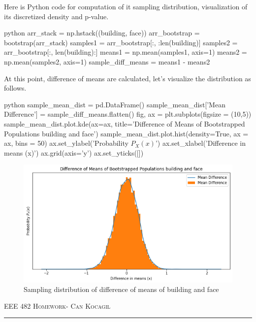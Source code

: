 \documentclass[12pt]{amsart}
\begin{document}
\bigskip
Here is Python code for computation of it sampling distribution, visualization of its discretized density and p-value.

\begin{mintedbox}{python}
arr_stack = np.hstack((building, face))
arr_bootstrap = bootstrap(arr_stack)
samples1 = arr_bootstrap[:, :len(building)]
samples2 = arr_bootstrap[:, len(building):]
means1 = np.mean(samples1, axis=1)
means2 = np.mean(samples2, axis=1)
sample_diff_means = means1 - means2
\end{mintedbox}

At this point, difference of means are calculated, let's visualize the distribution as follows.

\begin{mintedbox}{python}
sample_mean_dist = pd.DataFrame()
sample_mean_dist['Mean Difference'] = sample_diff_means.flatten()
fig, ax = plt.subplots(figsize = (10,5))
sample_mean_dist.plot.kde(ax=ax, title='Difference of Means of Bootstrapped Populations building and face')
sample_mean_dist.plot.hist(density=True, ax = ax, bins = 50)
ax.set_ylabel('Probability $P_X(x)$')
ax.set_xlabel('Difference in means (x)')
ax.grid(axis='y')
ax.set_yticks([])
\end{mintedbox}


\begin{figure}[h]
    \centering
    \includegraphics[width = 1\textwidth]{images/11.png}
    \caption{Sampling distribution of difference of means of building and face}
\end{figure}

\newpage
{\scshape EEE 482} \hfill {\scshape \large  Homework-\relax} \hfill {\scshape Can Kocagil}
\smallskip
\hrule
\vspace{2mm}
\end{document}
